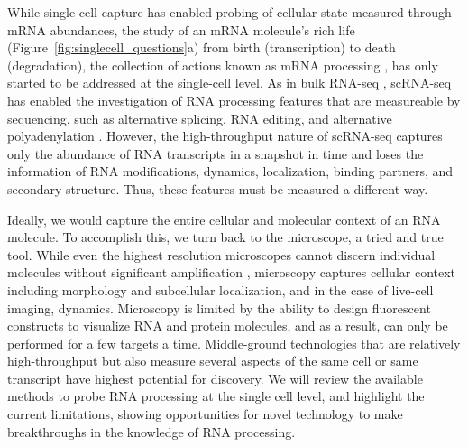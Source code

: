 While single-cell capture has enabled probing of cellular state measured through mRNA abundances, the study of an mRNA molecule's rich life (Figure~\ref{fig:singlecell_questions}a) from birth (transcription) to death (degradation), the collection of actions known as mRNA processing \cite{Blanc2003-wk,Gerstberger:2014bx,Yeo:2016vz,Nussbacher:2015cwa,Singh:2015jg}, has only started to be addressed at the single-cell level. As in bulk RNA-seq \cite{Anders:2012esa,Kleinman:2012cu,Lianoglou:2013gw,Nishikura2010-dk,Park:2012hz,Peng2012-ru,Shen:2014gs,Wang:2008gt}, scRNA-seq has enabled the investigation of RNA processing features that are measureable by sequencing, such as alternative splicing, RNA editing, and alternative polyadenylation \cite{Karlsson2017-wy,Marinov2014-iw,Picardi2017-bv,Shalek2013-ez,Velten:2015ie,Welch:2016iz}. However, the high-throughput nature of scRNA-seq captures only the abundance of RNA transcripts in a snapshot in time and loses the information of RNA modifications, dynamics, localization, binding partners, and secondary structure. Thus, these features must be measured a different way.

Ideally, we would capture the entire cellular and molecular context of an RNA molecule. To accomplish this, we turn back to the microscope, a tried and true tool. While even the highest resolution microscopes cannot discern individual molecules without significant amplification \cite{Femino1998-ws,Raj2009-ni}, microscopy captures cellular context including morphology and subcellular localization, and in the case of live-cell imaging, dynamics. Microscopy is limited by the ability to design fluorescent constructs to visualize RNA and protein molecules, and as a result, can only be performed for a few targets a time. Middle-ground technologies that are relatively high-throughput but also measure several aspects of the same cell or same transcript \cite{Gierahn2017-ko,Macaulay2017-tb} have highest potential for discovery.
We will review the available methods to probe RNA processing at the single cell level, and highlight the current limitations, showing opportunities for novel technology to make breakthroughs in the knowledge of RNA processing.

